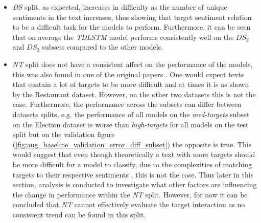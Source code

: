 \begin{itemize}
    \item \textit{DS} split, as expected, increases in difficulty as the number of unique sentiments in the text increases, thus showing that target sentiment relation to be a difficult task for the models to perform. Furthermore, it can be seen that on average the \textit{TDLSTM} model performs consistently well on the $DS_2$ and $DS_3$ subsets compared to the other models.
    \item \textit{NT} split does not have a consistent affect on the performance of the models, this was also found in one of the original papers \citep{zhang-etal-2019-aspect}. One would expect texts that contain a lot of targets to be more difficult and at times it is as shown by the Restaurant dataset. However, on the other two datasets this is not the case. Furthermore, the performance across the subsets can differ between datasets splits, e.g. the performance of all models on the \textit{med-targets} subset on the Election dataset is worse than \textit{high-targets} for all models on the test split but on the validation figure (\ref{fig:aug_baseline_validation_error_diff_subset}) the opposite is true. This would suggest that even though theoretically a text with more targets should be more difficult for a model to classify, due to the complexities of matching targets to their respective sentiments \citep{zhang-etal-2019-aspect}, this is not the case. Thus later in this section, analysis is conducted to investigate what other factors are influencing the change in performance within the \textit{NT} split. However, for now it can be concluded that \textit{NT} cannot effectively evaluate the target interaction as no consistent trend can be found in this split.

\end{itemize}
